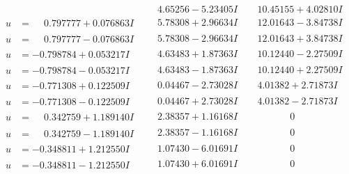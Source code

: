 \documentclass[1p]{elsarticle_modified}
\theoremstyle{definition}
\begin{document}
$$\begin{array}{c|c|c}
 & \phantom{-}4.65256 - 5.23405 I & \phantom{-}10.45155 + 4.02810 I \\ \hline\begin{aligned}
u &= \phantom{-}0.797777 + 0.076863 I\end{aligned}
 & \phantom{-}5.78308 + 2.96634 I & \phantom{-}12.01643 - 3.84738 I \\ \hline\begin{aligned}
u &= \phantom{-}0.797777 - 0.076863 I\end{aligned}
 & \phantom{-}5.78308 - 2.96634 I & \phantom{-}12.01643 + 3.84738 I \\ \hline\begin{aligned}
u &= -0.798784 + 0.053217 I\end{aligned}
 & \phantom{-}4.63483 + 1.87363 I & \phantom{-}10.12440 - 2.27509 I \\ \hline\begin{aligned}
u &= -0.798784 - 0.053217 I\end{aligned}
 & \phantom{-}4.63483 - 1.87363 I & \phantom{-}10.12440 + 2.27509 I \\ \hline\begin{aligned}
u &= -0.771308 + 0.122509 I\end{aligned}
 & \phantom{-}0.04467 - 2.73028 I & \phantom{-}4.01382 + 2.71873 I \\ \hline\begin{aligned}
u &= -0.771308 - 0.122509 I\end{aligned}
 & \phantom{-}0.04467 + 2.73028 I & \phantom{-}4.01382 - 2.71873 I \\ \hline\begin{aligned}
u &= \phantom{-}0.342759 + 1.189140 I\end{aligned}
 & \phantom{-}2.38357 + 1.16168 I & \phantom{-0.000000 } 0 \\ \hline\begin{aligned}
u &= \phantom{-}0.342759 - 1.189140 I\end{aligned}
 & \phantom{-}2.38357 - 1.16168 I & \phantom{-0.000000 } 0 \\ \hline\begin{aligned}
u &= -0.348811 + 1.212550 I\end{aligned}
 & \phantom{-}1.07430 - 6.01691 I & \phantom{-0.000000 } 0 \\ \hline\begin{aligned}
u &= -0.348811 - 1.212550 I\end{aligned}
 & \phantom{-}1.07430 + 6.01691 I & \phantom{-0.000000 } 0 \\ \hline\begin{aligned}

\end{aligned}
\end{array}$$
\end{document}
